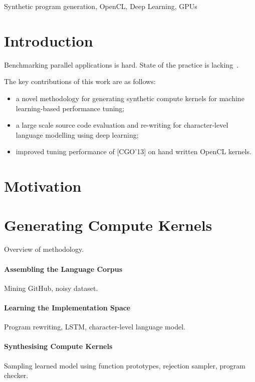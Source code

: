 \documentclass[preprint,nonatbib,10pt,nocopyrightspace]{sigplanconf}
\begin{document}


\keywords
Synthetic program generation, %
OpenCL, %
Deep Learning, %
GPUs

\section{Introduction}\label{sec:introduction}

Benchmarking parallel applications is hard. State of the practice is
lacking~\cite{Belli2015}.

The key contributions of this work are as follows:%
\begin{itemize}
\item a novel methodology for generating synthetic compute kernels for
  machine learning-based performance tuning;
\item a large scale source code evaluation and re-writing for
  character-level language modelling using deep learning;
\item improved tuning performance of [CGO'13] on hand written OpenCL
  kernels.
\end{itemize}


\section{Motivation}\label{sec:motivation}


\section{Generating Compute Kernels}\label{sec:}

Overview of methodology.

\paragraph{Assembling the Language Corpus} Mining GitHub, noisy
dataset.


\paragraph{Learning the Implementation Space} Program rewriting, LSTM,
character-level language model.


\paragraph{Synthesising Compute Kernels} Sampling learned model using
function prototypes, rejection sampler, program checker.
\end{document}
